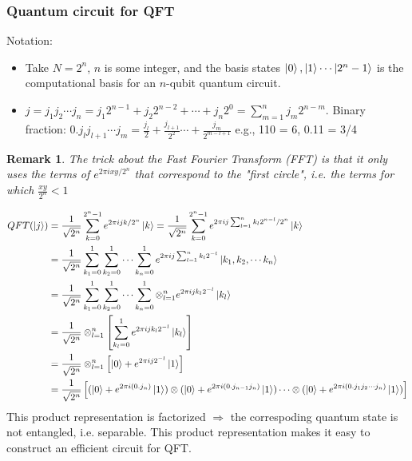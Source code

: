 \documentclass[]{book}
\newtheorem*{remark}{Remark}
\theoremstyle{nonumberplain}
\begin{document}
\subsubsection{Quantum circuit for QFT}
Notation: 
\begin{itemize}
    \item Take $N=2^{n}$, $n$ is some integer, and the basis states $\ket{0},\ket{1}\cdots\ket{2^{n}-1}$ is the computational basis for an $n$-qubit quantum circuit.
    \item $j=j_{1}j_{2}\cdots j_{n}=j_{1}2^{n-1}+j_{2}2^{n-2}+\cdots + j_{n}2^{0}= \sum^{n}_{m=1} j_{m}2^{n-m}$. Binary fraction: $0.j_{l}j_{l+1}\cdots j_{m} = \frac{j_{l}}{2}+\frac{j_{l+1}}{2^{2}}\cdots + \frac{j_{m}}{2^{m-l+1}}$   e.g., 110 = 6, 0.11 = 3/4
\end{itemize}
\begin{remark}
	The trick about the Fast Fourier Transform (FFT) is that it only uses the terms of $e^{2\pi i x y/2^{n}}$ that correspond to the "first circle", i.e. the terms for which $\frac{xy}{2^{n}} < 1$
\end{remark}
\begin{equation*}
\begin{aligned}
	QFT(\ket{j}) &= \frac{1}{\sqrt{2^{n}}} \sum^{2^{n}-1}_{k=0} e^{2\pi i j k /2^{n}}\ket{k} = \frac{1}{\sqrt{2^{n}}} \sum^{2^{n}-1}_{k=0} e^{2\pi i j \sum^{n}_{l=1} k_{l}2^{n-l}/2^{n}}\ket{k} \\
					 &= \frac{1}{\sqrt{2^{n}}} \sum^{1}_{k_{1}=0}   \sum^{1}_{k_{2}=0} \cdots \sum^{1}_{k_{n}=0} e^{2\pi i j \sum^{n}_{l=1} k_{l}2^{-l}}\ket{k_{1},k_{2},\cdots k_{n}}  \\
					 &= \frac{1}{\sqrt{2^{n}}} \sum^{1}_{k_{1}=0}   \sum^{1}_{k_{2}=0} \cdots \sum^{1}_{k_{n}=0} \otimes^{n}_{l=1} e^{2\pi i j k_{l}2^{-l}}\ket{k_{l}} \\
					 &= \frac{1}{\sqrt{2^n}}\otimes^{n}_{l=1}\left[ \sum^{1}_{k_{l}=0} e^{2\pi i j k_{l} 2^{-l}}\ket{k_{l}}\right] \\
					 &= \frac{1}{\sqrt{2^n}}\otimes^{n}_{l=1}\left[ \ket{0}+e^{2\pi i j 2^{-l}}\ket{1}\right] \\
					 &= \frac{1}{\sqrt{2^{n}}}\left[(\ket{0}+e^{2\pi i (0.j_{n})}\ket{1})\otimes(\ket{0}+e^{2\pi i (0.j_{n-1}j_{n})}\ket{1})\cdots \otimes(\ket{0}+e^{2\pi i (0.j_{1}j_{2}\cdots j_{n})}\ket{1})\right]
\end{aligned}
\end{equation*}
This product representation is factorized $\Rightarrow$ the correspoding quantum state is not entangled, i.e. separable. This product representation makes it easy to construct an efficient circuit for QFT. 
\end{document}
